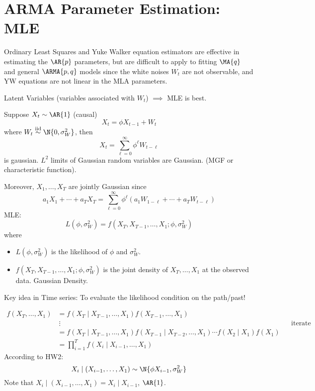 \section{ARMA Parameter Estimation: MLE}
Ordinary Least Squares and Yuke Walker equation
estimators are effective in estimating the $ \AR{p} $
parameters, but are difficult to apply to fitting
$ \MA{q} $ and general $ \ARMA{p,q} $
models since the white noises $ W_t $ are not observable,
and YW equations are not linear in the MLA parameters.

Latent Variables (variables associated with $ W_t $) $\implies$
MLE is best.

Suppose $ X_t \sim \AR{1} $ (causal)
\[ X_t=\phi X_{t-1}+W_t \]
where $ W_t \stackrel{\text{iid}}{\sim}\N{0,\sigma_W^2} $,
then
\[ X_t=\sum_{\ell=0}^{\infty} \phi^\ell W_{t-\ell} \]
is gaussian. $ L^2 $ limits of Gaussian random variables are Gaussian.
(MGF or characteristic function).

Moreover, $ X_1,\ldots,X_T $ are jointly Gaussian since
\[ a_1X_1+\cdots+a_T X_T= \sum_{\ell=0}^{\infty}
    \phi^\ell (a_1 W_{1-\ell}+\cdots+a_T W_{t-\ell}) \]
MLE\@:
\[ L(\phi,\sigma_W^2)=f(X_T, X_{T-1},\ldots,X_1;\phi,\sigma_W^2) \]
where
\begin{itemize}
    \item $L(\phi,\sigma_W^2)$ is the likelihood of $ \phi $ and $ \sigma_W^2 $.
    \item $f(X_T, X_{T-1},\ldots,X_1;\phi,\sigma_W^2)$ is the joint density
          of $ X_T,\ldots,X_1 $ at the observed data. Gaussian Density.
\end{itemize}
Key idea in Time series: To evaluate the likelihood condition on
the path/past!

\begin{align*}
    f(X_T,\ldots,X_1)
     & =f(X_T\mid X_{T-1},\ldots,X_1)f(X_{T-1},\ldots,X_1)                                                            \\
     & \:\vdots                                                                                   &  & \text{iterate} \\
     & =f(X_T\mid X_{T-1},\ldots,X_1)f(X_{T-1}\mid X_{T-2},\ldots,X_1)\cdots f(X_2\mid X_1)f(X_1)                     \\
     & =\prod_{i=1}^T f(X_i\mid X_{i-1},\ldots,X_1)
\end{align*}
According to HW2:
\[ X_i \mid (X_{i-1},\ldots,X_1)\sim \N{\phi X_{i-1},\sigma_W^2} \]
Note that $  X_i \mid (X_{i-1},\ldots,X_1)=X_i\mid X_{i-1} $, $ \AR{1} $.

